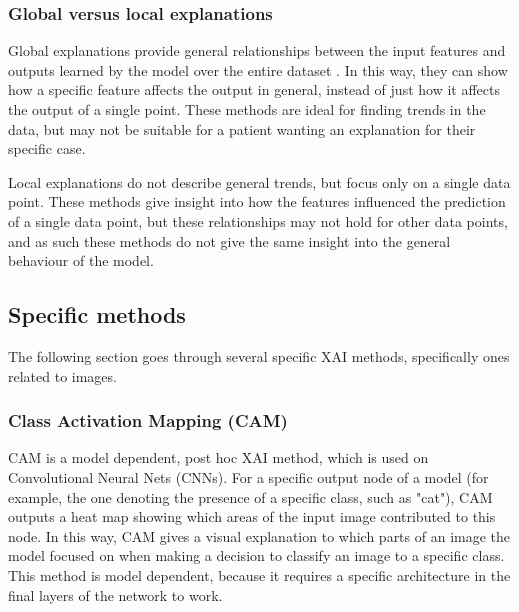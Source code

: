 \documentclass[conference]{IEEEtran}
\begin{document}
\subsubsection{Global versus local explanations}

Global explanations provide general relationships between the input features and outputs learned by the model over the entire dataset \cite{xaioverview}. In this way, they can show how a specific feature affects the output in general, instead of just how it affects the output of a single point. These methods are ideal for finding trends in the data, but may not be suitable for a patient wanting an explanation for their specific case.

Local explanations do not describe general trends, but focus only on a single data point. These methods give insight into how the features influenced the prediction of a single data point, but these relationships may not hold for other data points, and as such these methods do not give the same insight into the general behaviour of the model.

\subsection{Specific methods}

The following section goes through several specific XAI methods, specifically ones related to images.
\\

\subsubsection{Class Activation Mapping (CAM)}

CAM \cite{cam} is a model dependent, post hoc XAI method, which is used on Convolutional Neural Nets (CNNs). For a specific output node of a model (for example, the one denoting the presence of a specific class, such as "cat"), CAM outputs a heat map showing which areas of the input image contributed to this node. In this way, CAM gives a visual explanation to which parts of an image the model focused on when making a decision to classify an image to a specific class. This method is model dependent, because it requires a specific architecture in the final layers of the network to work.
\end{document}

